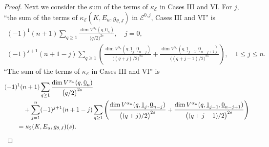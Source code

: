 \documentclass[pdftex]{sigma}
\numberwithin{equation}{section}
\newcommand{\cE}{\mathcal{E}}
\begin{document}
\begin{proof}
 Next we consider the sum of the terms of $\kappa_{\cE}$ in Cases III and VI.
 For $j$,
 ``the sum of the terms of $\kappa_{\cE} (K, E_{u} , g_{\theta , J} ) $ in $\cE^{0,j}$, Cases III and VI'' is
 \begin{gather*}
 (-1 )^{1} (n+1)
 \sum_{q \geq 1 }
 \frac{
 \dim V^{\alpha_u} ( q ,\underline{0}_{n} )
 }{
 \bigl( q/2 \bigr)^{2s}
 }
 ,
\quad
 j = 0,
 \\
 (-1 )^{j+1} (n+1-j)
 \sum_{q \geq 1 }
 \left(
 \frac{
 \dim V^{\alpha_u} ( q, \underline{1}_{j} ,\underline{0}_{n-j} )
 }{
 \bigl( ( q+j)/2 \bigr)^{2s}
 }
 +
 \frac{
 \dim V^{\alpha_u} ( q, \underline{1}_{j-1} ,\underline{0}_{n-j+1} )
 }{
 \bigl( (q+j-1)/2 \bigr)^{2s}
 }
 \right)
 ,\quad
 1 \leq j \leq n.
 \end{gather*}
 ``The sum of the terms of $\kappa_{\cE}$ in Cases III and VI'' is
 \begin{align}
 &
 (-1 )^{1} (n+1)
 \sum_{q \geq 1 }
 \frac{
 \dim V^{\alpha_u} ( q, \underline{0}_{n} )
 }{
 \bigl( q /2 \bigr)^{2s}
 }
 \notag
 \\
 & \qquad\quad{}+
 \sum_{j=1}^{n}
 (-1 )^{j+1} (n+1-j)
 \sum_{q \geq 1 }
 \left(
 \frac{
 \dim V^{\alpha_u} ( q, \underline{1}_{j} ,\underline{0}_{n-j} )
 }{
 \bigl( ( q+j)/2 \bigr)^{2s}
 }
 +
 \frac{
 \dim V^{\alpha_u} ( q, \underline{1}_{j-1} ,\underline{0}_{n-j+1} )
 }{
 \bigl( (q+j-1)/2 \bigr)^{2s}
 }
 \right)
 \notag
 \\
 &\qquad{}= \kappa_{2} (K, E_{u} , g_{\theta , J} ) (s) .
 \label{eq:kappa2_formula-01}
 \end{align}


\end{proof}
\end{document}
